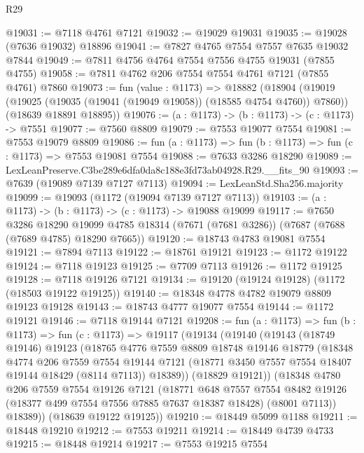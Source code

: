 \begin{lexlean}{R29}
\begin{coremodule}
@19031 := @7118 @4761 @7121
@19032 := @19029 @19031
@19035 := @19028 (@7636 @19032) @18896
@19041 := @7827 @4765 @7554 @7557 @7635 @19032 @7844
@19049 := @7811 @4756 @4764 @7554 @7556 @4755 @19031 (@7855 @4755)
@19058 := @7811 @4762 @206 @7554 @7554 @4761 @7121 (@7855 @4761) @7860
@19073 := fun (value : @1173) =>
  @18882
    (@18904
      (@19019 (@19025 (@19035 (@19041 (@19049 @19058)) (@18585 @4754 @4760)) @7860))
      (@18639 @18891 @18895))
@19076 := (a : @1173) -> (b : @1173) -> (c : @1173) -> @7551
@19077 := @7560 @8809
@19079 := @7553 @19077 @7554
@19081 := @7553 @19079 @8809
@19086 := fun (a : @1173) => fun (b : @1173) => fun (c : @1173) => @7553 @19081 @7554
@19088 := @7633 @3286 @18290
@19089 := LexLeanPreserve.C3be289e6dfa0da8c188e3fd73ab04928.R29.__fits_90
@19093 := @7639 (@19089 @7139 @7127 @7113)
@19094 := LexLeanStd.Sha256.majority
@19099 := @19093 (@1172 (@19094 @7139 @7127 @7113))
@19103 := (a : @1173) -> (b : @1173) -> (c : @1173) -> @19088 @19099
@19117 := @7650
    @3286
    @18290
    @19099
    @4785
    @18314
    (@7671 (@7681 @3286))
    (@7687 (@7688 (@7689 @4785) @18290 @7665))
@19120 := @18743 @4783 @19081 @7554
@19121 := @7894 @7113
@19122 := @18761 @19121
@19123 := @1172 @19122
@19124 := @7118 @19123
@19125 := @7709 @7113
@19126 := @1172 @19125
@19128 := @7118 @19126 @7121
@19134 := @19120 (@19124 @19128) (@1172 (@18503 @19122 @19125))
@19140 := @18348 @4778 @4782 @19079 @8809 @19123 @19128
@19143 := @18743 @4777 @19077 @7554
@19144 := @1172 @19121
@19146 := @7118 @19144 @7121
@19208 := fun (a : @1173) =>
  fun (b : @1173) =>
  fun (c : @1173) =>
  @19117
    (@19134
      (@19140
        (@19143
          (@18749 @19146)
          @19123
          (@18765
            @4776
            @7559
            @8809
            @18748
            @19146
            @18779
            (@18348
              @4774
              @206
              @7559
              @7554
              @19144
              @7121
              (@18771 @3450 @7557 @7554 @18407 @19144 @18429 (@8114 @7113))
              @18389))
          (@18829 @19121))
        (@18348
          @4780
          @206
          @7559
          @7554
          @19126
          @7121
          (@18771
            @648
            @7557
            @7554
            @8482
            @19126
            (@18377 @499 @7554 @7556 @7885 @7637 @18387 @18428)
            (@8001 @7113))
          @18389))
      (@18639 @19122 @19125))
@19210 := @18449 @5099 @1188
@19211 := @18448 @19210
@19212 := @7553 @19211
@19214 := @18449 @4739 @4733
@19215 := @18448 @19214
@19217 := @7553 @19215 @7554

\end{coremodule}
\end{lexlean}
